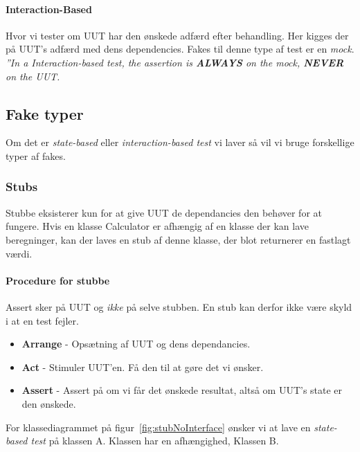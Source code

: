 \paragraph{Interaction-Based} Hvor vi tester om UUT har den ønskede adfærd efter behandling. Her kigges der på UUT's adfærd med dens dependencies. Fakes til denne type af test er en \textit{mock}.\\

\textit{''In a Interaction-based test, the assertion is \textbf{ALWAYS} on the mock, \textbf{NEVER} on the UUT.}

\subsection{Fake typer}
Om det er \textit{state-based} eller \textit{interaction-based test} vi laver så vil vi bruge forskellige typer af fakes.

\subsubsection{Stubs}
Stubbe eksisterer kun for at give UUT de dependancies den behøver for at fungere.
Hvis en klasse Calculator er afhængig af en klasse der kan lave beregninger, kan der laves en stub af denne klasse, der blot returnerer en fastlagt værdi. 


\paragraph{Procedure for stubbe} Assert sker på UUT og \textit{ikke} på selve stubben. En stub kan derfor ikke være skyld i at en test fejler.

\begin{itemize}
	\item \textbf{Arrange} - Opsætning af UUT og dens dependancies.
	\item \textbf{Act} - Stimuler UUT'en. Få den til at gøre det vi ønsker.
	\item \textbf{Assert} - Assert på om vi får det ønskede resultat, altså om UUT's state er den ønskede.
\end{itemize}


For klassediagrammet på figur~\ref{fig:stubNoInterface} ønsker vi at lave en \textit{state-based test} på klassen A. Klassen har en afhængighed, Klassen B.

